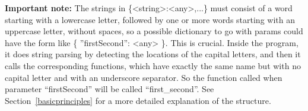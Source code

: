 \documentclass[11pt]{article} %
\begin{document}
\begin{tcolorbox}[title=Sending ``params'' to the server]
\textbf{Important note:} The strings in \{<string>:<any>,...\} must consist of a word starting with a lowercase letter, followed by one or more words starting with an uppercase letter, without spaces, so a possible dictionary to go with params could have the form like { \{ {''}firstSecond{''}: <any> \}}. This is crucial. Inside the program, it does string parsing by detecting the locations of the capital letters, and then it calls the corresponding functions, which have exactly the same name but with no capital letter and with an underscore separator. So the function called when parameter ``firstSecond'' will be called ``first\_second''. See Section~\ref{basicprinciples} for a more detailed explanation of the structure.  

\end{tcolorbox}



 
\end{document}
